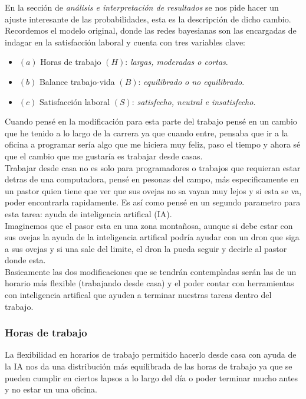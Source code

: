 En la sección de \textit{análisis e interpretación de resultados} se nos pide hacer un 
ajuste interesante de las probabilidades, esta es la descripción de dicho cambio.\\ 


Recordemos el modelo original, donde las redes bayesianas son las encargadas de indagar en 
la satisfacción laboral y cuenta con tres variables clave:
\begin{itemize}
    \item[] $(a)$ Horas de trabajo $(H)$: \textit{largas, moderadas o cortas}.
    \item[] $(b)$ Balance trabajo-vida $(B)$: \textit{equilibrado o no equilibrado}.
    \item[] $(c)$ Satisfacción laboral $(S)$: \textit{satisfecho, neutral e insatisfecho}.
\end{itemize}


Cuando pensé en la modificación para esta parte del trabajo pensé en un cambio que he tenido
a lo largo de la carrera ya que cuando entre, pensaba que ir a la oficina a programar sería 
algo que me hiciera muy feliz, paso el tiempo y ahora sé que el cambio que me gustaría es 
trabajar desde casas. \\ 

Trabajar desde casa no es solo para programadores o trabajos que requieran estar detras de 
una computadora, pensé en pesonas del campo, más especificamente en un pastor quien tiene que 
ver que sus ovejas no sa vayan muy lejos y si esta se va, poder encontrarla rapidamente. Es 
así como pensé en un segundo parametro para esta tarea: ayuda de inteligencia artifical (IA). \\ 

Imaginemos que el pasor esta en una zona montañosa, aunque si debe estar con sus ovejas 
la ayuda de la inteligencia artifical podría ayudar con un dron que siga a sus ovejas y si 
una sale del limite, el dron la pueda seguir y decirle al pastor donde esta. \\ 

Basicamente las dos modificaciones que se tendrán contempladas serán las de un horario más 
flexible (trabajando desde casa) y el poder contar con herramientas con inteligencia artifical
que ayuden a terminar nuestras tareas dentro del trabajo.\\ 


\subsubsection*{Horas de trabajo}
La flexibilidad en horarios de trabajo permitido hacerlo desde casa con ayuda de la IA nos 
da una distribución más equilibrada de las horas de trabajo ya que se pueden cumplir en 
ciertos lapsos a lo largo del día o poder terminar mucho antes y no estar un una oficina.

